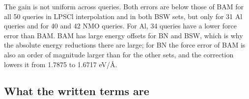The gain is not uniform across queries. Both errors are below those of BAM for all 50 queries in LPSCl interpolation and in both BSW sets, but only for 31 Al queries and for 40 and 42 NMO queries. For Al, 34 queries have a lower force error than BAM. BAM has large energy offsets for BN and BSW, which is why the absolute energy reductions there are large; for BN the force error of BAM is also an order of magnitude larger than for the other sets, and the correction lowers it from 1.7875 to 1.6717 eV/\AA.

\subsection{What the written terms are}

\begin{table}[t]
\caption{Selected terms, same formula relative energy error and the effect of refinement. Term counts sum over the selected corrections of all contexts; terms per correction are median (range). The force errors compare the best candidate after the five initial calls with the selected candidate after refinement.}
\label{tab:terms}
\footnotesize
\setlength{\tabcolsep}{4pt}
\end{table}

